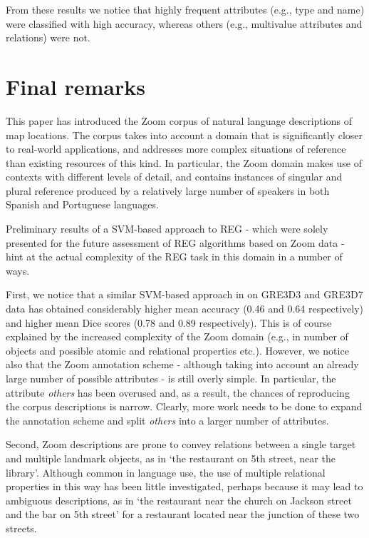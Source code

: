 \documentclass{article}
\begin{document}
From these results we notice that highly frequent attributes (e.g., type and name) were classified  with high accuracy, whereas others (e.g., multivalue attributes and relations) were not. 



\section{Final remarks}
\label{sec-final}

This paper has introduced the Zoom corpus of natural language descriptions of map locations. The corpus takes into account a domain that is significantly closer to real-world applications, and addresses more complex situations of reference than existing resources of this kind. In particular, the Zoom domain makes use of  contexts with different levels of detail, and contains instances of singular and plural reference produced by a relatively large number of speakers in both Spanish and Portuguese languages.

Preliminary results of a SVM-based approach to REG - which were solely presented for the future assessment of REG algorithms based on Zoom data - hint at the actual complexity of the REG task in this domain in a number of ways. 

First, we notice that a similar SVM-based approach in \cite{thiago-svm} on GRE3D3 and GRE3D7 data has obtained considerably higher mean accuracy (0.46 and 0.64 respectively) and higher mean Dice scores (0.78 and 0.89 respectively). This is of course explained by the increased complexity of the Zoom domain (e.g., in number of objects and possible atomic and relational properties etc.). However, we notice also that the Zoom annotation scheme - although taking into account an already large number of possible attributes - is still overly simple. In particular, the attribute {\em others} has been overused and, as a result, the chances of reproducing the corpus descriptions is narrow. Clearly, more work needs to be done to expand the annotation scheme and split {\em others} into a larger number of attributes.

Second, Zoom descriptions are prone to convey relations between a single target and multiple landmark objects, as in `the restaurant on 5th street, near the library'. Although common in language use, the use of multiple relational properties in this way has been little investigated, perhaps because it may lead to ambiguous descriptions, as in `the restaurant near the church on Jackson street and the bar on 5th street' for a restaurant located near the junction of these two streets.
\end{document}
